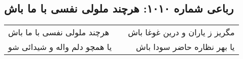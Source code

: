 \begin{center}
\section*{رباعی شماره ۱۰۱۰: هرچند ملولی نفسی با ما باش}
\label{sec:1010}
\begin{longtable}{l p{0.5cm} r}
هرچند ملولی نفسی با ما باش
&&
مگریز ز یاران و درین غوغا باش
\\
یا همچو دلم واله و شیدائی شو
&&
یا بهر نظاره حاضر سودا باش
\\
\end{longtable}
\end{center}
